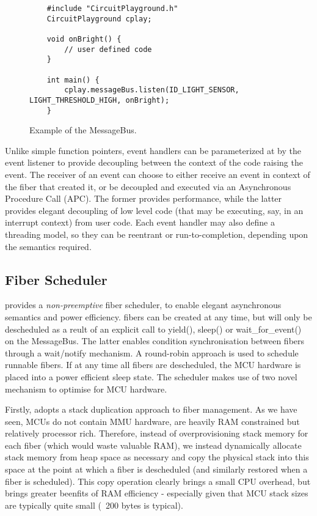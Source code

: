\begin{figure}
    \begin{lstlisting}
    #include "CircuitPlayground.h"
    CircuitPlayground cplay;
    
    void onBright() {
        // user defined code
    }
    
    int main() {
        cplay.messageBus.listen(ID_LIGHT_SENSOR, LIGHT_THRESHOLD_HIGH, onBright);
    }
    \end{lstlisting}
    \caption{\label{fig:messageBus}Example of the \CO MessageBus.}
\end{figure}
    
Unlike simple function pointers, \CO event handlers can be parameterized at by the event listener to provide decoupling between the context of the code raising the event. The receiver of an event can choose to either receive an event in context of the fiber that created it, or be decoupled and executed via an Asynchronous Procedure Call (APC). The former provides performance, while the latter provides elegant decoupling of low level code (that may be executing, say, in an interrupt context) from user code. Each event handler may also define a threading model, so they can be reentrant or run-to-completion, depending upon the semantics required.

\subsection{Fiber Scheduler}
\CO provides a \emph{non-preemptive} fiber scheduler, to enable elegant asynchronous semantics and power efficiency. \CO fibers can be created at any time, but will only be descheduled as a reult of an explicit call to yield(), sleep() or wait\_for\_event() on the MessageBus. The latter enables condition synchronisation between fibers through a wait/notify mechanism. A round-robin approach is used to schedule runnable fibers. If at any time all fibers are descheduled, the MCU hardware is placed into a power efficient sleep state. The \CO scheduler makes use of two novel mechanism to optimise for MCU hardware. 

Firstly, \CO adopts a stack duplication approach to fiber management. As we have seen, MCUs do not contain MMU hardware, are heavily RAM constrained but relatively processor rich. Therefore, instead of overprovisioning stack memory for each fiber (which would waste valuable RAM), we instead dynamically allocate stack memory from heap space as necessary and copy the physical stack into this space at the point at which a fiber is descheduled (and similarly restored when a fiber is scheduled). This copy operation clearly brings a small CPU overhead, but brings greater beenfits of RAM efficiency - especially given that MCU stack sizes are typically quite small (~200 bytes is typical). 

